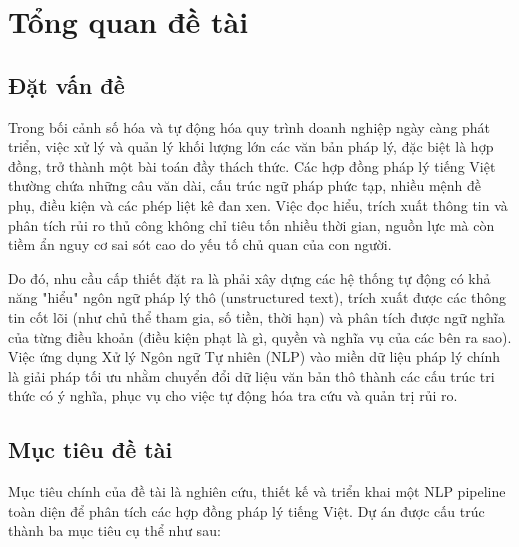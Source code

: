 \section{Tổng quan đề tài}

\subsection{Đặt vấn đề}
Trong bối cảnh số hóa và tự động hóa quy trình doanh nghiệp ngày càng phát triển, việc xử lý và quản lý khối lượng lớn các văn bản pháp lý, đặc biệt là hợp đồng, trở thành một bài toán đầy thách thức. Các hợp đồng pháp lý tiếng Việt thường chứa những câu văn dài, cấu trúc ngữ pháp phức tạp, nhiều mệnh đề phụ, điều kiện và các phép liệt kê đan xen. Việc đọc hiểu, trích xuất thông tin và phân tích rủi ro thủ công không chỉ tiêu tốn nhiều thời gian, nguồn lực mà còn tiềm ẩn nguy cơ sai sót cao do yếu tố chủ quan của con người. 

Do đó, nhu cầu cấp thiết đặt ra là phải xây dựng các hệ thống tự động có khả năng "hiểu" ngôn ngữ pháp lý thô (unstructured text), trích xuất được các thông tin cốt lõi (như chủ thể tham gia, số tiền, thời hạn) và phân tích được ngữ nghĩa của từng điều khoản (điều kiện phạt là gì, quyền và nghĩa vụ của các bên ra sao). Việc ứng dụng Xử lý Ngôn ngữ Tự nhiên (NLP) vào miền dữ liệu pháp lý chính là giải pháp tối ưu nhằm chuyển đổi dữ liệu văn bản thô thành các cấu trúc tri thức có ý nghĩa, phục vụ cho việc tự động hóa tra cứu và quản trị rủi ro.

\subsection{Mục tiêu đề tài}
Mục tiêu chính của đề tài là nghiên cứu, thiết kế và triển khai một NLP pipeline toàn diện để phân tích các hợp đồng pháp lý tiếng Việt. Dự án được cấu trúc thành ba mục tiêu cụ thể như sau:

